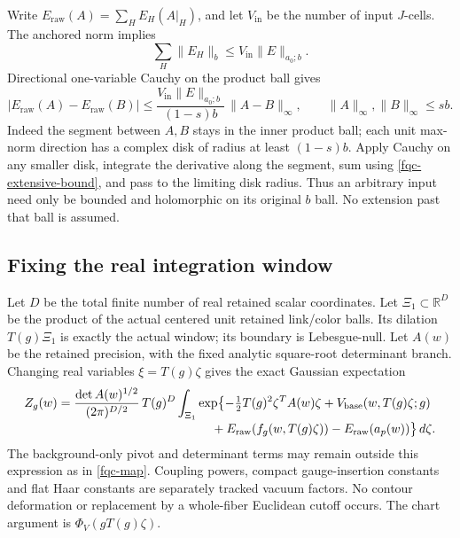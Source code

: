 Write $E_{\mathrm{raw}}(A)=\sum_H E_H(A|_H)$, and let
$V_{\mathrm{in}}$ be the number of input $J$-cells. The anchored norm
implies
\begin{equation}
 \sum_H\lVert E_H\rVert_b
       \leq V_{\mathrm{in}}\lVert E\rVert_{a_0;b}.
 \label{fqc-extensive-bound}
\end{equation}
Directional one-variable Cauchy on the product ball gives
\begin{equation}
 |E_{\mathrm{raw}}(A)-E_{\mathrm{raw}}(B)|
 \leq
 \frac{V_{\mathrm{in}}\lVert E\rVert_{a_0;b}}
      {(1-s)b}\,\lVert A-B\rVert_\infty,
 \qquad \lVert A\rVert_\infty,\lVert B\rVert_\infty\leq sb.
 \label{fqc-input-cauchy}
\end{equation}
Indeed the segment between $A,B$ stays in the inner product ball;
each unit max-norm direction has a complex disk of radius at least
$(1-s)b$. Apply Cauchy on any smaller disk, integrate the derivative
along the segment, sum using \eqref{fqc-extensive-bound}, and pass
to the limiting disk radius. Thus an arbitrary input need only be
bounded and holomorphic on its original $b$ ball. No extension
past that ball is assumed.

\subsection{Fixing the real integration window}
\label{fqc-integral-section}

Let $D$ be the total finite number of real retained scalar
coordinates. Let $\Xi_1\subset\mathbb R^D$ be the product of the
actual centered unit retained link/color balls. Its dilation
$T(g)\Xi_1$ is exactly the actual window; its boundary is
Lebesgue-null. Let $A(w)$ be the retained precision, with the
fixed analytic square-root determinant branch. Changing real
variables $\xi=T(g)\zeta$ gives the exact Gaussian expectation
\begin{align}
 Z_g(w)
 ={}&\frac{\det A(w)^{1/2}}{(2\pi)^{D/2}}\,T(g)^D
       \int_{\Xi_1}
       \exp\bigl\{
          -\tfrac12 T(g)^2\zeta^T A(w)\zeta
          +V_{\mathrm{base}}(w,T(g)\zeta;g)
 \notag\\[-2pt]
 &\hspace{39mm}
          +E_{\mathrm{raw}}(f_g(w,T(g)\zeta))
          -E_{\mathrm{raw}}(a_p(w))
       \bigr\}\,d\zeta .
 \label{fqc-integral}
\end{align}
The background-only pivot and determinant terms may remain outside
this expression as in \eqref{fqc-map}. Coupling powers, compact
gauge-insertion constants and flat Haar constants are separately
tracked vacuum factors. No contour deformation or replacement
by a whole-fiber Euclidean cutoff occurs. The chart argument is
$\Phi_V(gT(g)\zeta)$.

